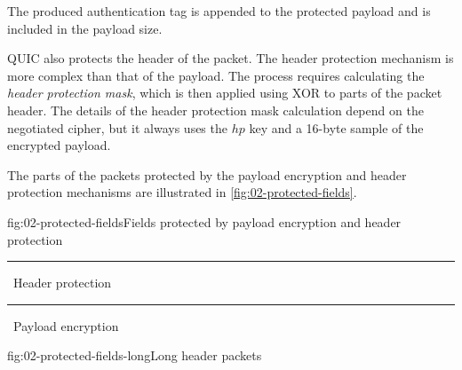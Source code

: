 The produced authentication tag is appended to the protected payload and is included in the payload
size.

QUIC also protects the header of the packet. The header protection mechanism is more complex than
that of the payload. The process requires calculating the \textit{header protection mask}, which is
then applied using XOR to parts of the packet header. The details of the header protection mask
calculation depend on the negotiated cipher, but it always uses the $hp$ key and a 16-byte sample of
the encrypted payload.

The parts of the packets protected by the payload encryption and header
protection mechanisms are illustrated in \autoref{fig:02-protected-fields}.


\begin{myFigure}{fig:02-protected-fields}{Fields protected by payload encryption and header protection}

  \newcommand{\legendsquare}[1]{%
    \textcolor{#1}{\rule{0.7em}{0.7em}}%
  }


  \legendsquare{hp}~Header protection \hspace{1cm} \legendsquare{pp}~Payload encryption

  \vspace{5mm}

  \begin{mySubFigure}{\textwidth}{fig:02-protected-fields-long}{Long header packets}


\end{mySubFigure}
\end{myFigure}
